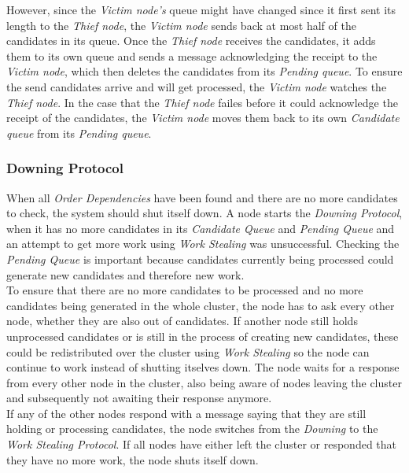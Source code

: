 However, since the \emph{Victim node's} queue might have changed since it first sent its length to the \emph{Thief node}, the \emph{Victim node} sends back at most half of the candidates in its queue.
Once the \emph{Thief node} receives the candidates, it adds them to its own queue and sends a message acknowledging the receipt to the \emph{Victim node}, which then deletes the candidates from its \emph{Pending queue}. 
To ensure the send candidates arrive and will get processed, the \emph{Victim node} watches the \emph{Thief node}.
In the case that the \emph{Thief node} failes before it could acknowledge the receipt of the candidates, the \emph{Victim node} moves them back to its own \emph{Candidate queue} from its \emph{Pending queue}.
 
\subsubsection{Downing Protocol} \label{protocol:downing}
When all \emph{Order Dependencies} have been found and there are no more candidates to check, the system should shut itself down.
A node starts the \emph{Downing Protocol}, when it has no more candidates in its \emph{Candidate Queue} and \emph{Pending Queue} and an attempt to get more work using \emph{Work Stealing} was unsuccessful. 
Checking the \emph{Pending Queue} is important because candidates currently being processed could generate new candidates and therefore new work.\\
To ensure that there are no more candidates to be processed and no more candidates being generated in the whole cluster, the node has to ask every other node, whether they are also out of candidates.
If another node still holds unprocessed candidates or is still in the process of creating new candidates, these could be redistributed over the cluster using \emph{Work Stealing} so the node can continue to work instead of shutting itselves down.
The node waits for a response from every other node in the cluster, also being aware of nodes leaving the cluster and subsequently not awaiting their response anymore.\\
If any of the other nodes respond with a message saying that they are still holding or processing candidates, the node switches from the \emph{Downing} to the \emph{Work Stealing Protocol}.
If all nodes have either left the cluster or responded that they have no more work, the node shuts itself down.

